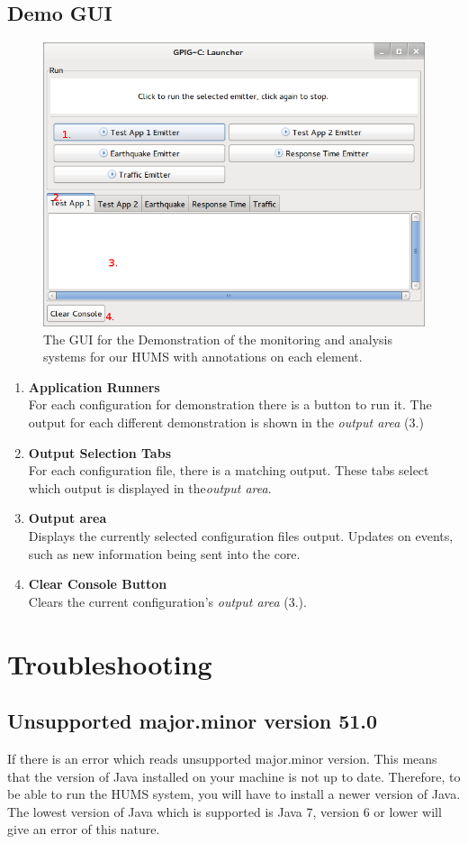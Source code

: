 \documentclass[10pt,a4paper]{article}
\begin{document}
\subsection{Demo GUI}
\begin{figure}[H]
  \centering
  \includegraphics[width=\textwidth]{images/demo-gui.png}
  \caption{The GUI for the Demonstration of the monitoring and analysis systems for our HUMS with annotations on each element.}
  \label{fig:demogui}
\end{figure}
\begin{enumerate}
\item \textbf{Application Runners} \\ For each configuration for demonstration there is a button to run it. The output for each different demonstration is shown in the \emph{output area} (3.)
\item \textbf{Output Selection Tabs} \\ For each configuration file, there is a matching output. These tabs select which output is displayed in the\emph{output area}.
\item \textbf{Output area} \\ Displays the currently selected configuration files output. Updates on events, such as new information being sent into the core.
\item \textbf{Clear Console Button} \\ 
Clears the current configuration's \emph{output area} (3.).
\end{enumerate}

\section{Troubleshooting}

\subsection{Unsupported major.minor version 51.0}

If there is an error which reads unsupported major.minor version. This means that the version of Java installed on your machine is not up to date. Therefore, to be able to run the HUMS system, you will have to install a newer version of Java. The lowest version of Java which is supported is Java 7, version 6 or lower will give an error of this nature.
\end{document}
